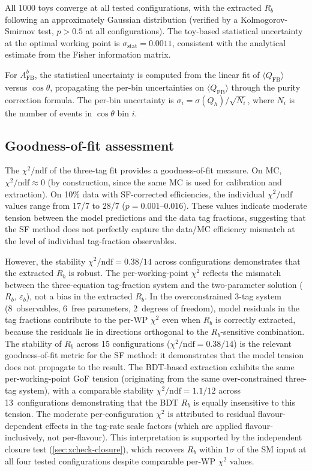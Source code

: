 \documentclass[11pt,a4paper]{article}
\begin{document}
All 1000 toys converge at all tested configurations, with the
extracted $R_b$ following an approximately Gaussian distribution
(verified by a Kolmogorov-Smirnov test, $p > 0.5$ at all
configurations).
The toy-based statistical uncertainty at the optimal working
point is $\sigma_\text{stat} = 0.0011$, consistent with the
analytical estimate from the Fisher information matrix.

For $A_\text{FB}^b$, the statistical uncertainty is computed
from the linear fit of $\langle Q_\text{FB}\rangle$ versus
$\cos\theta$, propagating the per-bin uncertainties on
$\langle Q_\text{FB}\rangle$ through the purity correction
formula.
The per-bin uncertainty is $\sigma_i = \sigma(Q_h) / \sqrt{N_i}$,
where $N_i$ is the number of events in $\cos\theta$ bin $i$.

\subsection{Goodness-of-fit assessment}
\label{sec:stat-gof}

The $\chi^2/\text{ndf}$ of the three-tag fit provides a
goodness-of-fit measure.
On MC, $\chi^2/\text{ndf} \approx 0$ (by construction, since
the same MC is used for calibration and extraction).
On 10\% data with SF-corrected efficiencies, the individual
$\chi^2/\text{ndf}$ values range from 17/7 to 28/7
($p = 0.001$--$0.016$).
These values indicate moderate tension between the model
predictions and the data tag fractions, suggesting that the
SF method does not perfectly capture the data/MC efficiency
mismatch at the level of individual tag-fraction observables.

However, the stability $\chi^2/\text{ndf} = 0.38/14$ across
configurations demonstrates that the extracted $R_b$ is
robust.
The per-working-point $\chi^2$ reflects the mismatch between the
three-equation tag-fraction system and the two-parameter solution
($R_b$, $\varepsilon_b$), not a bias in the extracted $R_b$.
In the overconstrained 3-tag system (8~observables, 6~free
parameters, 2~degrees of freedom), model residuals in the
tag fractions contribute to the per-WP $\chi^2$ even when $R_b$
is correctly extracted, because the residuals lie in directions
orthogonal to the $R_b$-sensitive combination.
The stability of $R_b$ across 15 configurations
($\chi^2/\text{ndf} = 0.38/14$) is the relevant goodness-of-fit
metric for the SF method: it demonstrates that the model tension
does not propagate to the result.
The BDT-based extraction exhibits the same per-working-point GoF
tension (originating from the same over-constrained three-tag system),
with a comparable stability $\chi^2/\text{ndf} = 1.1/12$ across
13~configurations demonstrating that the BDT $R_b$ is equally
insensitive to this tension.
The moderate per-configuration $\chi^2$ is attributed to
residual flavour-dependent effects in the tag-rate scale
factors (which are applied flavour-inclusively, not per-flavour).
This interpretation is supported by the independent closure test
(\cref{sec:xcheck-closure}), which recovers $R_b$ within
$1\sigma$ of the SM input at all four tested configurations
despite comparable per-WP $\chi^2$ values.
\end{document}
